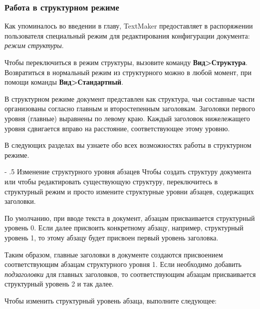 ﻿\documentclass[a4paper,10pt]{article}
\makeatletter
\renewcommand\paragraph{%
   \@startsection{paragraph}{4}{0mm}%
      {-\baselineskip}%
      {.5\baselineskip}%
      {\normalfont\normalsize\bfseries}}
\makeatother
\begin{document}
\subsubsection{Работа в структурном режиме}
Как упоминалось во введении в главу, TextMaker предоставляет в распоряжении пользователя специальный режим для редактирования конфигурации документа: \textit{режим структуры}.

Чтобы переключиться в режим структуры, вызовите команду \textbf{Вид>Структура}. Возвратиться в нормальный режим из структурного можно в любой момент, при помощи команды \textbf{Вид>Стандартный}.

В структурном режиме документ представлен как структура, чьи составные части организованы согласно главным и второстепенным заголовкам. Заголовки первого уровня (главные) выравнены по левому краю. Каждый заголовок нижележащего уровня сдвигается вправо на расстояние, соответствующее этому уровню.

В следующих разделах вы узнаете обо всех возможностях работы в структурном режиме.

\paragraph{Изменение структурного уровня абзацев}
Чтобы создать структуру документа или чтобы редактировать существующую структуру, переключитесь в структурный режим и просто измените структурные уровни абзацев, содержащих заголовки.

По умолчанию, при вводе текста в документ, абзацам присваивается структурный уровень 0. Если далее присвоить конкретному абзацу, например, структурный уровень 1, то этому абзацу будет присвоен первый уровень заголовка.

Таким образом, главные заголовки в документе создаются присвоением соответствующим абзацам структурного уровня 1. Если необходимо добавить \textit{подзаголовки} для главных заголовков, то соответствующим абзацам присваивается структурный уровень 2 и так далее.

Чтобы изменить структурный уровень абзаца, выполните следующее:
\end{document}
